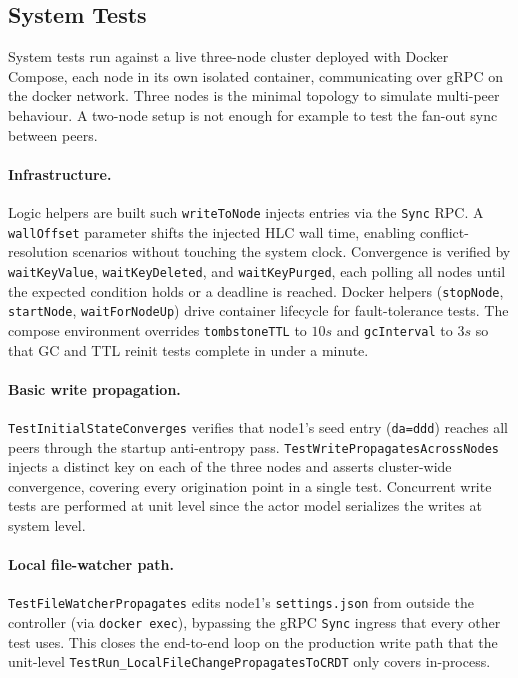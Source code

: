 \documentclass[conference]{IEEEtran}
\begin{document}
\subsection{System Tests}

System tests run against a live three-node cluster deployed with Docker Compose, each node in its own isolated container,
communicating over gRPC on the docker network. Three nodes is the minimal topology to simulate multi-peer behaviour.
A two-node setup is not enough for example to test the fan-out sync between peers.

\paragraph{Infrastructure.}
Logic helpers are built such \texttt{writeToNode} injects entries via the \texttt{Sync} RPC.
A \texttt{wallOffset} parameter shifts the
injected HLC wall time, enabling conflict-resolution scenarios
without touching the system clock.
Convergence is verified by \texttt{waitKeyValue}, \texttt{waitKeyDeleted}, and
\texttt{waitKeyPurged}, each polling all nodes until the expected condition holds
or a deadline is reached. Docker helpers
(\texttt{stopNode}, \texttt{startNode}, \texttt{waitForNodeUp}) drive
container lifecycle for fault-tolerance tests.
The compose environment overrides \texttt{tombstoneTTL} to $10s$ and
\texttt{gcInterval} to $3s$ so that GC and TTL reinit tests complete in under a
minute.

\paragraph{Basic write propagation.}
\texttt{TestInitialStateConverges} verifies that node1's seed entry
(\texttt{da=ddd}) reaches all peers through the startup anti-entropy pass.
\texttt{TestWritePropagatesAcrossNodes} injects a distinct
key on each of the three nodes and asserts cluster-wide convergence,
covering every origination point in a single test. Concurrent write tests are performed
at unit level since the actor model serializes the writes at system level.

\paragraph{Local file-watcher path.}
\texttt{TestFileWatcherPropagates} edits node1's \texttt{settings.json} from
outside the controller (via \texttt{docker exec}), bypassing the gRPC
\texttt{Sync} ingress that every other test uses. This closes the end-to-end loop on the production
write path that the unit-level \texttt{TestRun\_LocalFileChangePropagatesToCRDT}
only covers in-process.
\end{document}
